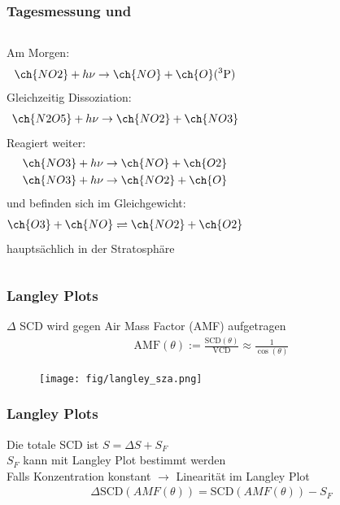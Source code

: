 \documentclass{beamer}
\begin{document}
\begin{frame}
    \frametitle{Tagesmessung  und }
    \begin{columns}
    	Am Morgen:
    	\begin{align}
    		\ch{NO2} + h \nu \to \ch{NO} + \ch{O}(^3\text{P})
    	\end{align}
    \pause
    	Gleichzeitig Dissoziation:
    	\begin{align}
    		\ch{N2O5} + h \nu \to \ch{NO2} + \ch{NO3}
    	\end{align}
    \pause
    	Reagiert weiter:
    	\begin{align}
    		\ch{NO3} + h \nu \to \ch{NO} + \ch{O2}\\
    		\ch{NO3} + h \nu \to \ch{NO2} + \ch{O}
    	\end{align}
    \pause	
      	 und  befinden sich im Gleichgewicht:
      		\begin{align}
      			\ch{O3} + \ch{NO} \rightleftharpoons \ch{NO2} + \ch{O2}
      		\end{align}
      	 hauptsächlich in der Stratosphäre	
    \end{columns}
\end{frame}

\begin{frame}
    \frametitle{Langley Plots}
    $\Delta$ SCD wird gegen Air Mass Factor (AMF) aufgetragen\\
    \begin{align}
        \text{AMF}(\theta) := \frac{\text{SCD}(\theta)}{\text{VCD}} \approx \frac{1}{\cos (\theta)}
    \end{align}
    \begin{figure}
        \texttt{[image: fig/langley\_sza.png]}
    \end{figure}
\end{frame}

\begin{frame}
    \frametitle{Langley Plots}
    Die totale SCD ist $S = \Delta S + S_F$\\
    $S_F$ kann mit Langley Plot bestimmt werden\\
    Falls Konzentration konstant $\to$ Linearität im Langley Plot
    \begin{align}
    	\Delta \text{SCD}(AMF(\theta)) = \text{SCD}(AMF(\theta)) - S_F
    \end{align}
\end{frame}
\end{document}
